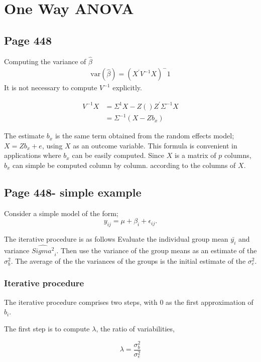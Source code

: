 \documentclass[12pt, a4paper]{report}
\theoremstyle{plain}
\theoremstyle{definition}
\theoremstyle{remark}
\begin{document}
	\section{One Way ANOVA}
	\subsection{Page 448}
	Computing the variance of $\hat{\beta}$
	\begin{eqnarray}
	\mbox{var}(\hat{\beta}) = (X^{\prime}V^{-1}X)^-1
	\end{eqnarray}
	It is not necessary to compute $V^{-1}$ explicitly.
	
	\begin{eqnarray}
	V^{-1}X &= \Sigma^{1}{X-Z()Z^{\prime}\Sigma^{-1}X} \\
	&= \Sigma^{-1}(X-Zb_{x})
	\end{eqnarray}
	
	The estimate $b_{x}$ is the same term obtained from the random effects model; $X = Zb_{x} + e$, using $X$ as an outcome variable.
	This formula is convenient in applications where $b_{x}$ can be easily computed. Since $X$ is a matrix of $p$ columns, $b_{x}$ can simple be computed column by column. according to the columns of $X$.
	\subsection{Page 448- simple example}
	Consider a simple model of the form;
	\begin{equation*}
	y_{ij} = \mu + \beta_{i} + \epsilon_{ij}.
	\end{equation*}
	
	The iterative procedure is as follows Evaluate the individual group mean $\bar{y_{i}}$ and variance $\hat{Sigma^2}_{i}$. Then use the variance of the group means as an estimate of the $\sigma^2_{b}$. The average of the the variances of the groups is the initial estimate of the $\sigma^2_{e}$.
	\subsubsection{Iterative procedure}
	
	The iterative procedure comprises two steps, with $0$ as the first approximation of $b_{i}$.
	
	The first step is to compute $\lambda$, the ratio of variabilities,
	
	\begin{equation*}
	\lambda = \frac{\sigma^2_{b}}{\sigma^2_{e}}
	\end{equation*}
	
\end{document}
